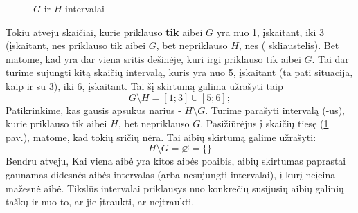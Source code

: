 \documentclass[a4paper]{article}
\newcommand{\germanqq}[1]{{\selectlanguage{german}\glqq#1\grqq\selectlanguage{english}}}
\begin{document}
\begin{figure}[!htbp]
      \centering
      \caption{$G$ ir $H$ intervalai}\label{fig:set_difference_number_line_3}
\end{figure}

Tokiu atveju skaičiai, kurie priklauso \textbf{tik} aibei $G$ yra nuo 1,
įskaitant, iki 3 (įskaitant, nes priklauso tik aibei $G$, bet nepriklauso $H$,
nes \germanqq{(} skliaustelis). Bet matome, kad yra dar viena sritis dešinėje,
kuri irgi priklauso tik aibei $G$. Tai dar turime sujungti kitą skaičių
intervalą, kuris yra nuo 5, įskaitant (ta pati situacija, kaip ir su 3), iki
6, įskaitant. Tai šį skirtumą galima užrašyti taip
\[G \setminus H = [1;3] \cup [5;6];\]
Patikrinkime, kas gausis apsukus narius - $ H \setminus G $. Turime parašyti
intervalą (-us), kurie priklauso tik aibei $H$, bet nepriklauso $G$.
Pasižiūrėjus į skaičių tiesę (\ref{fig:set_difference_number_line_3} pav.),
matome, kad tokių sričių nėra. Tai aibių skirtumą galime užrašyti:
\[H \setminus G = \varnothing = \{\} \]
Bendru atveju, Kai viena aibė yra kitos aibės poaibis, aibių skirtumas
paprastai gaunamas didesnės aibės intervalas (arba nesujungti intervalai), į
kurį neįeina mažesnė aibė. Tikslūs intervalai priklausys nuo konkrečių
susijusių aibių galinių taškų ir nuo to, ar jie įtraukti, ar neįtraukti.
\end{document}
